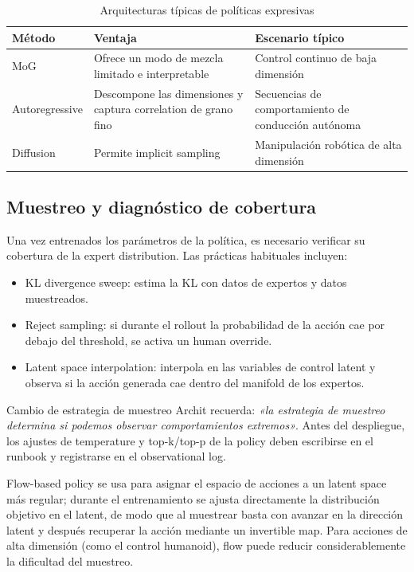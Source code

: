 \documentclass[a4paper]{article}
\begin{document}
\begin{table}[H]
\centering
\begin{tabular}{p{} p{} p{}}
\toprule
Método & Ventaja & Escenario típico \\
\midrule
MoG & Ofrece un modo de mezcla limitado e interpretable & Control continuo de baja dimensión \\
Autoregressive & Descompone las dimensiones y captura correlation de grano fino & Secuencias de comportamiento de conducción autónoma \\
Diffusion & Permite implicit sampling & Manipulación robótica de alta dimensión \\
\bottomrule
\end{tabular}
\caption{Arquitecturas típicas de políticas expresivas}
\end{table}

\subsection{Muestreo y diagnóstico de cobertura}

Una vez entrenados los parámetros de la política, es necesario verificar su cobertura de la expert distribution. Las prácticas habituales incluyen:
\begin{itemize}
    \item KL divergence sweep: estima la KL con datos de expertos y datos muestreados.
    \item Reject sampling: si durante el rollout la probabilidad de la acción cae por debajo del threshold, se activa un human override.
    \item Latent space interpolation: interpola en las variables de control latent y observa si la acción generada cae dentro del manifold de los expertos.
\end{itemize}

\begin{knowledgebox}{Cambio de estrategia de muestreo}
Archit recuerda: \textit{«la estrategia de muestreo determina si podemos observar comportamientos extremos»}. Antes del despliegue, los ajustes de temperature y top-k/top-p de la policy deben escribirse en el runbook y registrarse en el observational log.
\end{knowledgebox}

Flow-based policy se usa para asignar el espacio de acciones a un latent space más regular; durante el entrenamiento se ajusta directamente la distribución objetivo en el latent, de modo que al muestrear basta con avanzar en la dirección latent y después recuperar la acción mediante un invertible map. Para acciones de alta dimensión (como el control humanoid), flow puede reducir considerablemente la dificultad del muestreo.
\end{document}
